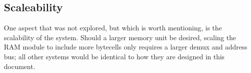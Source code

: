 \subsection{Scaleability}
One aspect that was not explored, but which is worth mentioning, is the scalability of the system. Should a larger memory unit be desired, scaling the RAM module to include more bytecells only requires a larger demux and address bus; all other systems would be identical to how they are designed in this document.
